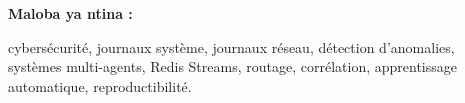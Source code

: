 \documentclass[12pt,a4paper,oneside]{report}
\begin{document}
\bigskip

\noindent

\textbf{Maloba ya ntina :}

cybersécurité, journaux système, journaux réseau, détection d'anomalies,
systèmes multi-agents, Redis Streams, routage, corrélation, apprentissage
automatique, reproductibilité.

\tableofcontents

\listoffigures

\listoftables




\clearpage
{}

\setcounter{table}{0}
\renewcommand{\thetable}{\arabic{table}}
\renewcommand{\theHtable}{\arabic{table}}
\setcounter{figure}{0}
\renewcommand{\thefigure}{\arabic{figure}}
\renewcommand{\theHfigure}{\arabic{figure}}






















\end{document}
